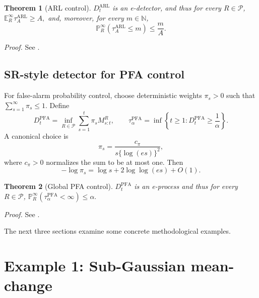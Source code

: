 \documentclass[12pt]{article}
\theoremstyle{spaced}
\newtheorem{theorem}{Theorem}[section]
\theoremstyle{remark}
\newcommand{\N}{\mathbb N}
\newcommand{\calP}{\mathcal P}
\newcommand{\Pinf}[1]{\mathbb P_{#1}^{\infty}}
\newcommand{\Einf}[1]{\mathbb E_{#1}^{\infty}}
\begin{document}
\begin{theorem}[ARL control]\label{thm:arl-control}
$D_t^{\mathrm{ARL}}$ is an e-detector, and thus for every $R\in\calP$,
$\Einf{R}\tau_A^{\mathrm{ARL}}\ge A,$
and, moreover, for every $m\in\N$,
\begin{equation}
    \label{eq:lfa}
     \Pinf{R}(\tau_A^{\mathrm{ARL}}\le m)\le \frac{m}{A}.
\end{equation}
\end{theorem}


\emph{Proof.} See .

\subsection{SR-style detector for PFA control}

For false-alarm probability control, choose deterministic weights $ \pi_s>0$ such that
  $\sum_{s=1}^{\infty}\pi_s\le1.$
Define
\begin{equation}\label{eq:ordinary-pfa-detector}
  D_t^{\mathrm{PFA}}
  =
  \inf_{R\in\calP}\sum_{s=1}^t \pi_sM_{s:t}^R,
  \qquad
  \tau_\alpha^{\mathrm{PFA}}
  =
  \inf\left\{t\ge1:D_t^{\mathrm{PFA}}\ge \frac1\alpha\right\}.
\end{equation}
A canonical choice is
\begin{equation}\label{eq:pi-weights}
  \pi_s=\frac{c_\pi}{s\{\log(e s)\}^2},
\end{equation}
where $c_\pi>0$ normalizes the sum to be at most one.  Then
\begin{equation}\label{eq:pi-log}
  -\log \pi_s=\log s+2\log\log(e s)+O(1).
\end{equation}

\begin{theorem}[Global PFA control]\label{thm:pfa-control}
$D_t^{\mathrm{PFA}}$ is an e-process and thus
for every $R\in\calP$, $ \Pinf{R}(\tau_\alpha^{\mathrm{PFA}}<\infty)\le \alpha.$
\end{theorem}


\emph{Proof.} See .


The next three sections examine some concrete methodological examples. 


\section{Example 1: Sub-Gaussian mean-change}
\label{sec:sub-Gaussian}
\end{document}
